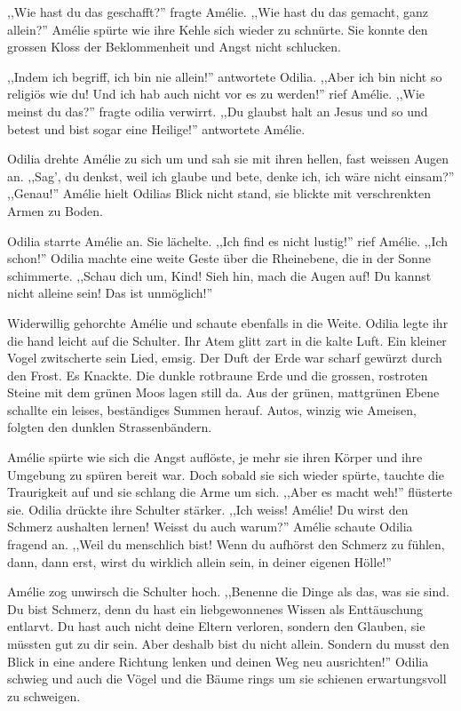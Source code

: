 \documentclass[11pt,titlepage,a5paper]{book}
\begin{document}
,,Wie hast du das geschafft?'' fragte Amélie. ,,Wie hast du das gemacht, ganz allein?'' Amélie spürte wie ihre Kehle sich wieder zu schnürte. Sie konnte den grossen Kloss der Beklommenheit und Angst nicht schlucken.

,,Indem ich begriff, ich bin nie allein!'' antwortete Odilia. ,,Aber ich bin nicht so religiös wie du! Und ich hab auch nicht vor es zu werden!'' rief Amélie. ,,Wie meinst du das?'' fragte odilia verwirrt. ,,Du glaubst halt an Jesus und so und betest und bist sogar eine Heilige!'' antwortete Amélie.

Odilia drehte Amélie zu sich um und sah sie mit ihren hellen, fast weissen Augen an. ,,Sag', du denkst, weil ich glaube und bete, denke ich, ich wäre nicht einsam?'' ,,Genau!'' Amélie hielt Odilias Blick nicht stand, sie blickte mit verschrenkten Armen zu Boden.

Odilia starrte Amélie an. Sie lächelte. ,,Ich find es nicht lustig!'' rief Amélie. ,,Ich schon!'' Odilia machte eine weite Geste über die Rheinebene, die in der Sonne schimmerte. ,,Schau dich um, Kind! Sieh hin, mach die Augen auf! Du kannst nicht alleine sein! Das ist unmöglich!''

Widerwillig gehorchte Amélie und schaute ebenfalls in die Weite. Odilia legte ihr die hand leicht auf die Schulter. Ihr Atem glitt zart in die kalte Luft. Ein kleiner Vogel zwitscherte sein Lied, emsig. Der Duft der Erde war scharf gewürzt durch den Frost. Es Knackte. Die dunkle rotbraune Erde und die grossen, rostroten Steine mit dem grünen Moos lagen still da. Aus der grünen, mattgrünen Ebene schallte ein leises, beständiges Summen herauf. Autos, winzig wie Ameisen, folgten den dunklen Strassenbändern.

Amélie spürte wie sich die Angst auflöste, je mehr sie ihren Körper und ihre Umgebung zu spüren bereit war. Doch sobald sie sich wieder spürte, tauchte die Traurigkeit auf und sie schlang die Arme um sich. ,,Aber es macht weh!'' flüsterte sie. Odilia drückte ihre Schulter stärker. ,,Ich weiss! Amélie! Du wirst den Schmerz aushalten lernen! Weisst du auch warum?'' Amélie schaute Odilia fragend an. ,,Weil du menschlich bist! Wenn du aufhörst den Schmerz zu fühlen, dann, dann erst, wirst du wirklich allein sein, in deiner eigenen Hölle!''

Amélie zog unwirsch die Schulter hoch. ,,Benenne die Dinge als das, was sie sind. Du bist Schmerz, denn du hast ein liebgewonnenes Wissen als Enttäuschung entlarvt. Du hast auch nicht deine Eltern verloren, sondern den Glauben, sie müssten gut zu dir sein. Aber deshalb bist du nicht allein. Sondern du musst den Blick in eine andere Richtung lenken und deinen Weg neu ausrichten!'' Odilia schwieg und auch die Vögel und die Bäume rings um sie schienen erwartungsvoll zu schweigen.
\end{document}
